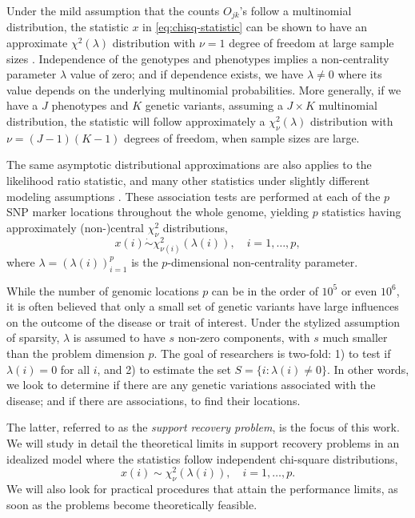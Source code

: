 Under the mild assumption that the counts $O_{jk}$'s follow a multinomial distribution, the statistic $x$ in \eqref{eq:chisq-statistic} can be shown to have an approximate $\chi^2(\lambda)$ distribution with $\nu=1$ degree of freedom at large sample sizes \citep{agresti2018introduction}. 
Independence of the genotypes and phenotypes implies a non-centrality parameter $\lambda$ value of zero; and if dependence exists, we have $\lambda\neq0$ where its value depends on the underlying multinomial probabilities.
More generally, if we have a $J$ phenotypes and $K$ genetic variants, assuming a $J\times K$ multinomial distribution, the statistic will follow approximately a $\chi^2_{\nu}(\lambda)$ distribution with $\nu = (J-1)(K-1)$ degrees of freedom, when sample sizes are large.

The same asymptotic distributional approximations are also applies to the likelihood ratio statistic, and many other statistics under slightly different modeling assumptions \cite{gao2019upass}.
These association tests are performed at each of the $p$ SNP marker locations throughout the whole genome, yielding $p$ statistics having approximately (non-)central $\chi^2_{\nu}$ distributions,
\begin{equation} \label{eq:model-chisquare-approx}
    x(i) \mathrel{\dot\sim} \chi_{\nu(i)}^2\left(\lambda(i)\right), \quad i=1,\ldots,p,
\end{equation}
where $\lambda = (\lambda(i))_{i=1}^p$ is the $p$-dimensional non-centrality parameter.

While the number of genomic locations $p$ can be in the order of $10^5$ or even $10^6$, it is often believed that only a small set of genetic variants have large influences on the outcome of the disease or trait of interest.
Under the stylized assumption of sparsity, $\lambda$ is assumed to have $s$ non-zero components, with $s$ much smaller than the problem dimension $p$. 
The goal of researchers is two-fold: 1) to test if $\lambda(i)=0$ for all $i$, and 2) to estimate the set $S=\{i:\lambda(i)\neq 0\}$.
In other words, we look to determine if there are any genetic variations associated with the disease; and if there are associations, to find their locations.

The latter, referred to as the \emph{support recovery problem}, is the focus of this work.
We will study in detail the theoretical limits in support recovery problems in an idealized model where the statistics follow independent chi-square distributions,
\begin{equation} \label{eq:model-chisq}
    x(i) \sim \chi_\nu^2\left(\lambda(i)\right), \quad i=1,\ldots,p.
\end{equation}
We will also look for practical procedures that attain the performance limits, as soon as the problems become theoretically feasible.


